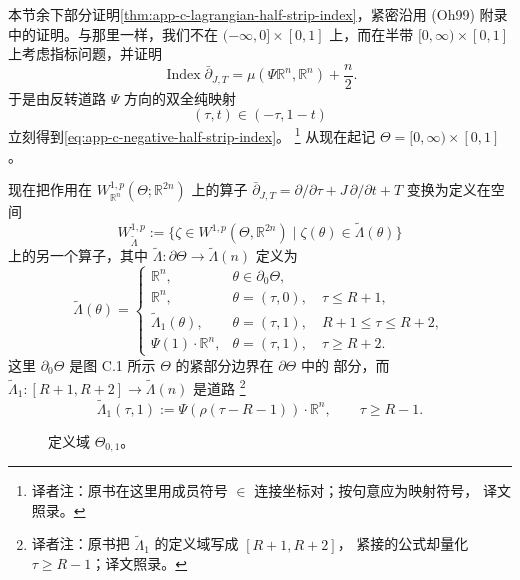 本节余下部分证明\cref{thm:app-c-lagrangian-half-strip-index}，紧密沿用 (Oh99) 附录
中的证明。与那里一样，我们不在 $(-\infty,0]\times[0,1]$ 上，而在半带
$[0,\infty)\times[0,1]$ 上考虑指标问题，并证明
\begin{equation}
\label{eq:app-c-positive-half-strip-index}
 \operatorname{Index}\bar\partial_{J,T}
 =\mu(\Psi\mathbb R^n,\mathbb R^n)+\frac n2.
\end{equation}
于是由反转道路 $\Psi$ 方向的双全纯映射
\[
 (\tau,t)\in(-\tau,1-t)
\]
立刻得到\eqref{eq:app-c-negative-half-strip-index}。
\footnote{译者注：原书在这里用成员符号 $\in$ 连接坐标对；按句意应为映射符号，
译文照录。}
从现在起记 $\Theta=[0,\infty)\times[0,1]$。

现在把作用在 $W_{\mathbb R^n}^{1,p}(\Theta;\mathbb R^{2n})$ 上的算子
$\bar\partial_{J,T}=\partial/\partial\tau+J\,\partial/\partial t+T$ 变换为定义在空间
\[
 W_{\widetilde\Lambda}^{1,p}
 :=\{\zeta\in W^{1,p}(\Theta,\mathbb R^{2n})
       \mid\zeta(\theta)\in\widetilde\Lambda(\theta)\}
\]
上的另一个算子，其中
$\widetilde\Lambda\colon\partial\Theta\to\widetilde\Lambda(n)$ 定义为
\[
 \widetilde\Lambda(\theta)=
 \begin{cases}
 \mathbb R^n,&\theta\in\partial_0\Theta,\\
 \mathbb R^n,&\theta=(\tau,0),\quad\tau\leq R+1,\\
 \widetilde\Lambda_1(\theta),&\theta=(\tau,1),\quad R+1\leq\tau\leq R+2,\\
 \Psi(1)\cdot\mathbb R^n,&\theta=(\tau,1),\quad\tau\geq R+2.
 \end{cases}
\]
这里 $\partial_0\Theta$ 是图 C.1 所示 $\Theta$ 的紧部分边界在 $\partial\Theta$ 中的
部分，而
$\widetilde\Lambda_1\colon[R+1,R+2]\to\widetilde\Lambda(n)$ 是道路
\footnote{译者注：原书把 $\widetilde\Lambda_1$ 的定义域写成 $[R+1,R+2]$，
紧接的公式却量化 $\tau\geq R-1$；译文照录。}
\[
 \widetilde\Lambda_1(\tau,1)
 :=\Psi(\rho(\tau-R-1))\cdot\mathbb R^n,
 \qquad\tau\geq R-1.
\]

\begin{figure}[htbp]
\centering
{}
\caption{定义域 $\Theta_{0,1}$。}
\label{fig:app-c-domain-theta}
\end{figure}

